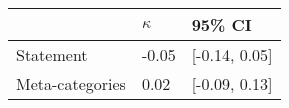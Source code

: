 \begin{tabular}{lll}
\hline
 & $\kappa$ & 95\% CI  \\
\hline
Statement & -0.05 & [-0.14, 0.05] \\
Meta-categories & 0.02 & [-0.09, 0.13] \\
\hline
\end{tabular}
